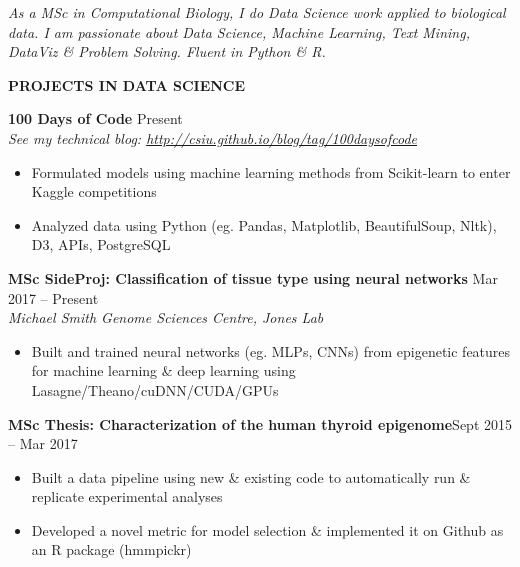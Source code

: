 \documentclass{res}
\renewcommand{\section}[1]{%
  \vspace{0.3in}%
  \centerline{\uppercase{\bf{#1}}}%
  \vspace{-6pt}}
\newcommand{\linehead}[2]{%
  {\bf #1} \hfill #2\\}
\newcommand{\linetitle}[1]{%
  {\sl #1}}
\begin{document}
\begin{resume}


\vspace{-1em}
\begin{center}
  {\it As a MSc in Computational Biology, I do Data Science work applied to biological data. I am passionate about Data Science, Machine Learning, Text Mining, DataViz \& Problem Solving. Fluent in Python \& R.}
\end{center}
\vspace{-1.5em}

\section{Projects in Data science}

\linehead{100 Days of Code}{Present}
\linetitle{See my technical blog: \url{http://csiu.github.io/blog/tag/100daysofcode}}
\begin{itemize}
  \item Formulated models using machine learning methods from Scikit-learn to enter Kaggle competitions
  \item Analyzed data using Python (eg. Pandas, Matplotlib, BeautifulSoup, Nltk), D3, APIs, PostgreSQL
\end{itemize}

\linehead{MSc SideProj: Classification of tissue type using neural networks}{Mar 2017 -- Present}
\linetitle{Michael Smith Genome Sciences Centre, Jones Lab}
\begin{itemize}
  \item Built and trained neural networks (eg. MLPs, CNNs) from epigenetic features for machine learning \& deep learning using Lasagne/Theano/cuDNN/CUDA/GPUs
\end{itemize}
\vspace{-0.5em}
{\bf MSc Thesis: Characterization of the human thyroid epigenome}\hfill{Sept 2015 -- Mar 2017}
\begin{itemize}
  \item Built a data pipeline using new \& existing code to automatically run \& replicate experimental analyses
  \item Developed a novel metric for model selection \& implemented it on Github as an R package (hmmpickr)
\end{itemize}


\end{resume}
\end{document}
